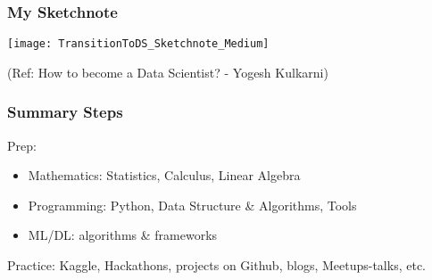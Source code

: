 \begin{frame}[fragile]\frametitle{My Sketchnote}
	
	\begin{center}
	\texttt{[image: TransitionToDS\_Sketchnote\_Medium]}
	\end{center}
{\tiny (Ref: How to become a Data Scientist? - Yogesh Kulkarni)}
\end{frame}

\begin{frame}[fragile]\frametitle{Summary Steps}

Prep:
      \begin{itemize}
			\item Mathematics: Statistics, Calculus, Linear Algebra
			\item Programming: Python, Data Structure \& Algorithms, Tools
			\item ML/DL: algorithms \& frameworks
			\end{itemize}
			
Practice: Kaggle, Hackathons, projects on Github, blogs, Meetups-talks, etc.
			
\end{frame}






